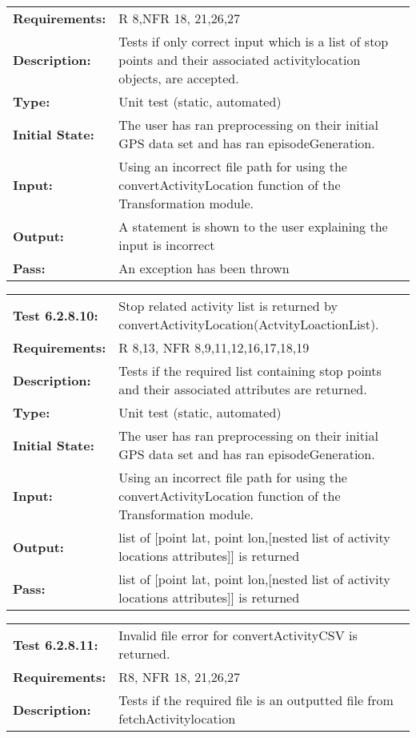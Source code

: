 \documentclass[12pt, titlepage]{article}
\begin{document}
{\begin{tabular}{|l|p{10cm}|}
    \bf{Requirements}: &  R 8,NFR 18, 21,26,27  \\
    \bf{Description}: & Tests if only correct input which is a list of stop points and their associated activitylocation objects, are accepted. \\
    \bf{Type}: & Unit test (static, automated) \\
    \bf{Initial State}: & The user has ran preprocessing on their initial GPS data set and has ran episodeGeneration. \\
    \bf{Input}: & Using an incorrect file path for using the convertActivityLocation function of the Transformation module.\\
    \bf{Output}: & A statement is shown to the user explaining the input is incorrect \\
    \bf{Pass}: & An exception has been thrown \\
    \hline
\end{tabular}
\begin{tabular}{|l|p{10cm}|}
    \hline
    \bf{Test} 6.2.8.10: & Stop related activity list is returned by convertActivityLocation(ActvityLoactionList).\\
    \bf{Requirements}: &  R 8,13, NFR 8,9,11,12,16,17,18,19\\
    \bf{Description}: & Tests if the required list containing stop points and their associated attributes are returned.\\
    \bf{Type}: & Unit test (static, automated) \\
    \bf{Initial State}: & The user has ran preprocessing on their initial GPS data set and has ran episodeGeneration. \\
    \bf{Input}: & Using an incorrect file path for using the convertActivityLocation function of the Transformation module.\\
    \bf{Output}: & list of [point lat, point lon,[nested list of activity locations attributes]] is returned\\
    \bf{Pass}: & list of [point lat, point lon,[nested list of activity locations attributes]] is returned \\
    \hline
\end{tabular}
\begin{tabular}{|l|p{10cm}|}
    \hline
    \bf{Test} 6.2.8.11: & Invalid file error for  convertActivityCSV is returned.\\
    \bf{Requirements}:  & R8, NFR 18, 21,26,27  \\
    \bf{Description}: & Tests if the required file is an outputted file from fetchActivitylocation\\

\end{tabular}}
\end{document}
